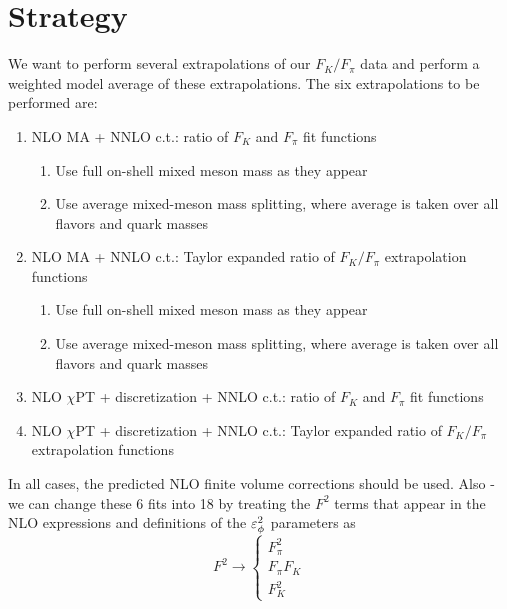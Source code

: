 \documentclass[prd,11pt,tightenlines,preprintnumbers,showpacs,superscriptaddress,notitlepage,nofootinbib,eqsecnum,floatfix,longbibliography]{revtex4-1}
\begin{document}
\section{Strategy}
We want to perform several extrapolations of our $F_K/F_\pi$ data and perform a weighted model average of these extrapolations.
The six extrapolations to be performed are:
\begin{enumerate}
\item NLO MA + NNLO c.t.: ratio of $F_K$ and $F_\pi$ fit functions
\begin{enumerate}
	\item Use full on-shell mixed meson mass as they appear
	\item Use average mixed-meson mass splitting, where average is taken over all flavors and quark masses
\end{enumerate}
\item NLO MA + NNLO c.t.: Taylor expanded ratio of $F_K/F_\pi$ extrapolation functions
\begin{enumerate}
	\item Use full on-shell mixed meson mass as they appear
	\item Use average mixed-meson mass splitting, where average is taken over all flavors and quark masses
\end{enumerate}



\item NLO $\chi$PT + discretization + NNLO c.t.: ratio of $F_K$ and $F_\pi$ fit functions

\item NLO $\chi$PT + discretization + NNLO c.t.: Taylor expanded ratio of $F_K/F_\pi$ extrapolation functions

\end{enumerate}
In all cases, the predicted NLO finite volume corrections should be used.
Also - we can change these 6 fits into 18 by treating the $F^2$ terms that appear in the NLO expressions and definitions of the ${\varepsilon}_\phi^2$ parameters as
\begin{equation}
F^2 \rightarrow \left\{
	\begin{matrix}
	F_\pi^2\\
	F_\pi F_K\\
	F_K^2
	\end{matrix}\right.
\end{equation}
\end{document}
